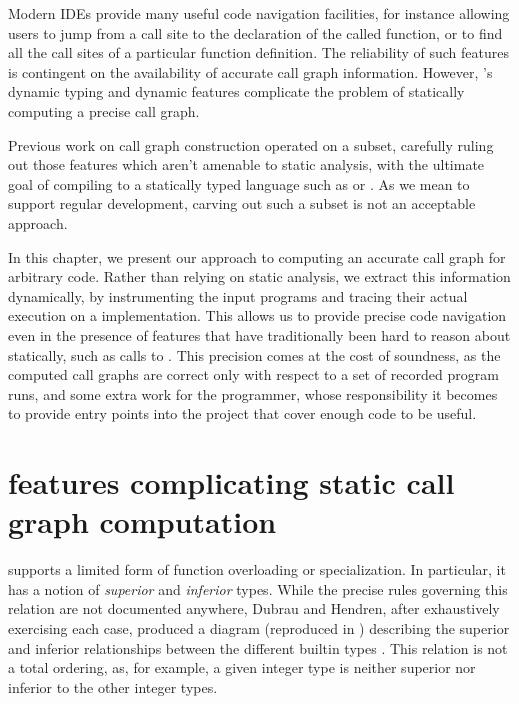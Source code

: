 Modern IDEs provide many useful code navigation facilities, for instance
allowing users to jump from a call site to the declaration of the called
function, or to find all the call sites of a particular function definition.
The reliability of such features is contingent on the availability of accurate
call graph information. However, \matlab's dynamic typing and dynamic features
complicate the problem of statically computing a precise call graph.

Previous work on \matlab call graph construction operated on a \matlab subset,
carefully ruling out those features which aren't amenable to static analysis,
with the ultimate goal of compiling \matlab to a statically typed language such
as \fortran or \xten \cite{Tamer}. As we mean to support regular \matlab
development, carving out such a subset is not an acceptable approach.

In this chapter, we present our approach to computing an accurate call graph
for arbitrary \matlab code. Rather than relying on static analysis, we extract
this information dynamically, by instrumenting the input programs and tracing
their actual execution on a \matlab implementation. This allows us to provide
precise code navigation even in the presence of features that have
traditionally been hard to reason about statically, such as calls to
. This precision comes at the cost of soundness, as the computed
call graphs are correct only with respect to a set of recorded program runs,
and some extra work for the programmer, whose responsibility it becomes to
provide entry points into the project that cover enough code to be useful.

\section{\matlab features complicating static call graph computation} \label{sec:MatlabLookup}

\matlab supports a limited form of function overloading or specialization. In
particular, it has a notion of \emph{superior} and \emph{inferior} types. While
the precise rules governing this relation are not documented anywhere, Dubrau
and Hendren, after exhaustively exercising each case, produced a diagram
(reproduced in ) describing the superior
and inferior relationships between the different builtin types \cite{Tamer}.
This relation is not a total ordering, as, for example, a given integer type is
neither superior nor inferior to the other integer types.

